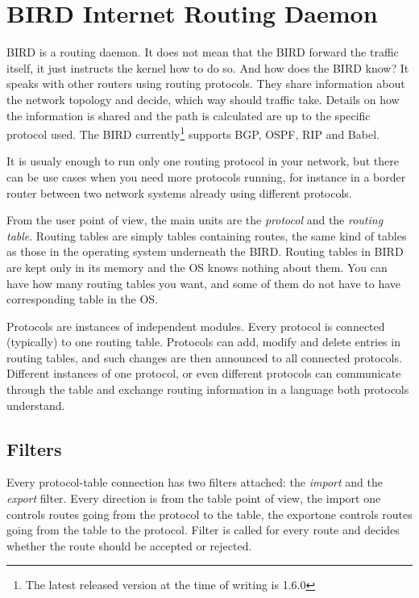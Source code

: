 \chapter{BIRD Internet Routing Daemon}

BIRD is a routing daemon. It does not mean that the BIRD forward the traffic
itself, it just instructs the kernel how to do so. And how does the BIRD know?
It speaks with other routers using routing protocols. They share information
about the network topology and decide, which way should traffic take. Details
on how the information is shared and the path is calculated are up to the
specific protocol used. The BIRD currently\footnote{The latest released version
at the time of writing is 1.6.0} supports BGP, OSPF, RIP and Babel.

It is usualy enough to run only one routing protocol in your network, but there
can be use cases when you need more protocols running, for instance in a border
router between two network systems already using different protocols.

From the user point of view, the main units are the \emph{protocol} and the
\emph{routing table}. Routing tables are simply tables containing routes, the
same kind of tables as those in the operating system underneath the BIRD.
Routing tables in BIRD are kept only in its memory and the OS knows nothing
about them. You can have how many routing tables you want, and some of them do
not have to have corresponding table in the OS.

Protocols are instances of independent modules. Every protocol is connected
(typically) to one routing table. Protocols can add, modify and delete entries
in routing tables, and such changes are then announced to all connected
protocols. Different instances of one protocol, or even different protocols can
communicate through the table and exchange routing information in a language
both protocols understand.

\section{Filters}
Every protocol-table connection has two filters attached: the \emph{import} and
the \emph{export} filter. Every direction is from the table point of view, the
import one controls routes going from the protocol to the table, the exportone
controls routes going from the table to the protocol. Filter is called for
every route and decides whether the route should be accepted or rejected.

